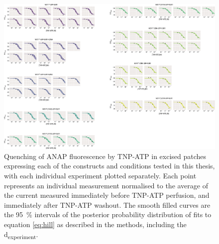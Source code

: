 \begin{figure}[h]
	\centering
	\includegraphics[width=\textwidth]{all_pcf_fits_4.pdf}
	\caption[Excised patch quenching sample hill fits]{
	Quenching of ANAP fluorescence by TNP-ATP in excised patches expressing each of the constructs and conditions tested in this thesis, with each individual experiment plotted separately.
	Each point represents an individual measurement normalised to the average of the current measured immediately before TNP-ATP perfusion, and immediately after TNP-ATP washout.
	The smooth filled curves are the \SI{95}{\percent} intervals of the posterior probability distribution of fits to equation \ref{eq:hill} as described in the methods, including the \textgreek{d}\textsubscript{experiment}.
	}
	\label{apxfig:pcf_2}
\end{figure}

